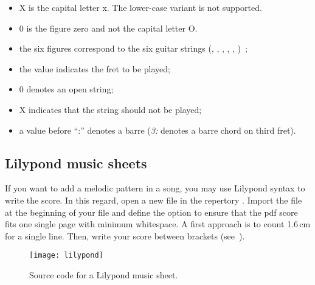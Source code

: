 \begin{nota}
  \begin{itemize}
  \item X is the capital letter x. The lower-case variant is not supported.
  \item 0 is the figure zero and not the capital letter O.
  \end{itemize}
\end{nota}

\begin{itemize}
\item the six figures correspond to the six guitar strings
  (, , , ,
  , )~;
\item the value indicates the fret to be played;
\item 0 denotes an open string;
\item X indicates that the string should not be played;
\item a value before ``:'' denotes a barre (\emph{3:} denotes a barre chord on third fret).
\end{itemize}

\subsection{Lilypond music sheets}

If you want to add a melodic pattern in a song, you may use Lilypond
syntax to write the score. In this regard, open a new file
 in the repertory .
Import the file  at the beginning of your file and define
the option  to ensure that the pdf score fits
one single page with minimum whitespace. A first approach is to count
1.6\,cm for a single line. Then, write your score between brackets
(see~).

\begin{figure}
  \begin{minipage}[b]{\linewidth}
    \centering
    \texttt{[image: lilypond]}
    \vspace{0.5cm}
  \end{minipage}

  \begin{minipage}[b]{\linewidth}
  \end{minipage}
  \caption{Source code for a Lilypond music sheet.}
  \label{fig:lilypond}
\end{figure}

